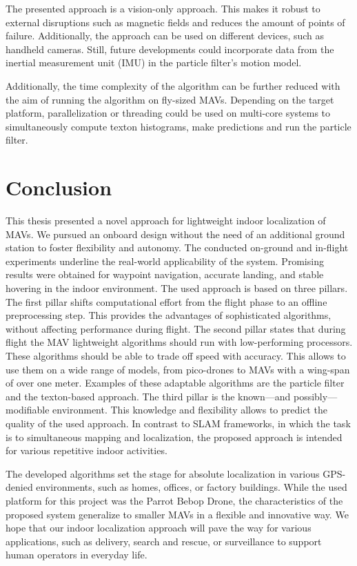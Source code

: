 \documentclass{report}
\begin{document}
The presented approach is a vision-only approach. This makes it robust
to external disruptions such as magnetic fields and reduces the amount
of points of failure. Additionally, the approach can be used on
different devices, such as handheld cameras. Still, future
developments could incorporate data from the inertial measurement unit
(IMU) in the particle filter's motion model.

Additionally, the time complexity of the algorithm can be further
reduced with the aim of running the algorithm on fly-sized
MAVs. Depending on the target platform, parallelization or threading
could be used on multi-core systems to simultaneously compute texton
histograms, make predictions and run the particle filter.



\chapter{Conclusion}
\label{chap:conclusion}

This thesis presented a novel approach for lightweight indoor
localization of MAVs. We pursued an onboard design without the need of
an additional ground station to foster flexibility and autonomy. The
conducted on-ground and in-flight experiments underline the real-world
applicability of the system. Promising results were obtained for
waypoint navigation, accurate landing, and stable hovering in the
indoor environment. The
used approach is based on three pillars.\\
The first pillar shifts computational effort from the flight phase to
an offline preprocessing step. This provides the advantages of
sophisticated algorithms, without affecting performance during flight.
The second pillar states that during flight the MAV lightweight
algorithms should run with low-performing processors. These algorithms
should be able to trade off speed with accuracy. This allows to use
them on a wide range of models, from pico-drones to MAVs with a
wing-span of over one meter. Examples of these adaptable algorithms
are the particle filter and the texton-based approach.  The third
pillar is the known---and possibly---modifiable environment. This
knowledge and flexibility allows to predict the quality of the used
approach. In contrast to SLAM frameworks, in which the task is to
simultaneous mapping and localization, the proposed approach is
intended for various repetitive indoor activities.


The developed algorithms set the stage for absolute localization in
various GPS-denied environments, such as homes, offices, or factory
buildings. While the used platform for this project was the Parrot
Bebop Drone, the characteristics of the proposed system generalize to
smaller MAVs in a flexible and innovative way.  We hope that our
indoor localization approach will pave the way for various
applications, such as delivery, search and rescue, or surveillance to
support human operators in everyday life.

\printbibliography
\end{document}

